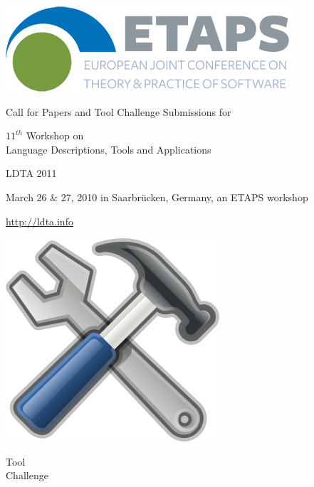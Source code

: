 \documentclass[10pt,A4paper]{article}
\begin{document}
\noindent
\begin{minipage}[b][1.6in][t]{1in}
\includegraphics[width=1.0\columnwidth]{images/etapsLogo.png}

\end{minipage}
\begin{minipage}[b][1.6in][t]{5in}
\begin{center}
Call for Papers and Tool Challenge Submissions for

\vspace{2mm}

{\Large $11^{th}$ Workshop on \\
Language Descriptions, Tools and Applications}

\vspace{3mm}

{\Large LDTA 2011}

\vspace{3mm}

March 26 \& 27, 2010 in Saarbr\"ucken, Germany, an ETAPS workshop

\vspace{2mm}

\url{http://ldta.info}
\end{center}
\end{minipage}
\begin{minipage}[b][1.6in][t]{1in}
\includegraphics[width=1.0\columnwidth]{images/Tools.png}
\vspace{-8mm}
\begin{center}
Tool \\
Challenge
\end{center}
\end{minipage}
\end{document}
